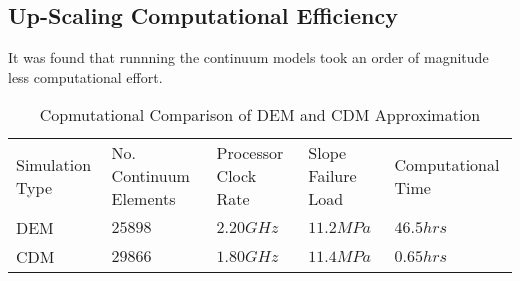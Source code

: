 \subsection{Up-Scaling Computational Efficiency}

It was found that runnning the continuum models took an order of magnitude less computational effort. 

\begin{table}[]
\centering
\caption{Copmutational Comparison of DEM and CDM Approximation}
\label{my-label}
\begin{tabular}{lllll}
Simulation Type & No. Continuum Elements & Processor Clock Rate & Slope Failure Load & Computational Time \\
DEM             & $25898$                & $2.20 GHz$           & $11.2 MPa$         & $46.5 hrs$         \\
CDM             & $29866$                & $1.80 GHz$           & $11.4 MPa$         & $0.65 hrs$        
\end{tabular}
\end{table}